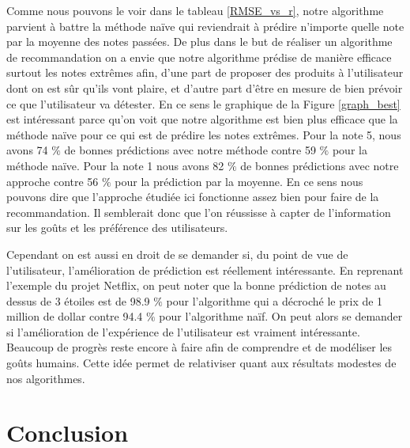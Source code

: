 \documentclass[10pt,a4paper]{article}
\begin{document}
Comme nous pouvons le voir dans le tableau \ref{RMSE_vs_r}, notre algorithme parvient à battre la méthode naïve qui reviendrait à prédire n'importe quelle note par la moyenne des notes passées. De plus dans le but de réaliser un algorithme de recommandation on a envie que notre algorithme prédise de manière efficace surtout les notes extrêmes afin, d'une part de proposer des produits à l'utilisateur dont on est sûr qu'ils vont plaire, et d'autre part d'être en mesure de bien prévoir ce que l'utilisateur va détester. En ce sens le graphique de la Figure \ref{graph_best} est intéressant parce qu'on voit que notre algorithme est bien plus efficace que la méthode naïve pour ce qui est de prédire les notes extrêmes. Pour la note 5, nous avons 74 $\%$ de bonnes prédictions avec notre méthode contre 59 $\%$ pour la méthode naïve. Pour la note 1 nous avons 82 $\%$ de bonnes prédictions avec notre approche contre 56 $\%$ pour la prédiction par la moyenne. En ce sens nous pouvons dire que l'approche étudiée ici fonctionne assez bien pour faire de la recommandation. Il semblerait donc que l'on réussisse à capter de l'information sur les goûts et les préférence des utilisateurs.

Cependant on est aussi en droit de se demander si, du point de vue de l'utilisateur, l'amélioration de prédiction est réellement intéressante. En reprenant l'exemple du projet Netflix, on peut noter que la bonne prédiction de notes au dessus de 3 étoiles est de 98.9 $\%$ pour l'algorithme qui a décroché le prix de 1 million de dollar contre 94.4 $\%$ pour l'algorithme naïf. On peut alors se demander si l'amélioration de l'expérience de l'utilisateur est vraiment intéressante. Beaucoup de progrès reste encore à faire afin de comprendre et de modéliser les goûts humains. Cette idée permet de relativiser quant aux résultats modestes de nos algorithmes.

\section*{Conclusion}

\newpage



\end{document}
